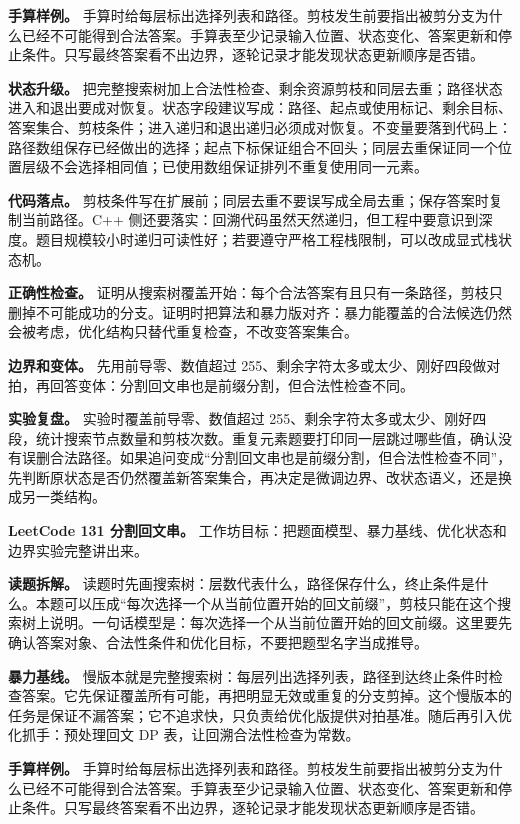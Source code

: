 \textbf{手算样例。} 手算时给每层标出选择列表和路径。剪枝发生前要指出被剪分支为什么已经不可能得到合法答案。手算表至少记录输入位置、状态变化、答案更新和停止条件。只写最终答案看不出边界，逐轮记录才能发现状态更新顺序是否错。

\textbf{状态升级。} 把完整搜索树加上合法性检查、剩余资源剪枝和同层去重；路径状态进入和退出要成对恢复。状态字段建议写成：路径、起点或使用标记、剩余目标、答案集合、剪枝条件；进入递归和退出递归必须成对恢复。不变量要落到代码上：路径数组保存已经做出的选择；起点下标保证组合不回头；同层去重保证同一个位置层级不会选择相同值；已使用数组保证排列不重复使用同一元素。

\textbf{代码落点。} 剪枝条件写在扩展前；同层去重不要误写成全局去重；保存答案时复制当前路径。C++ 侧还要落实：回溯代码虽然天然递归，但工程中要意识到深度。题目规模较小时递归可读性好；若要遵守严格工程栈限制，可以改成显式栈状态机。

\textbf{正确性检查。} 证明从搜索树覆盖开始：每个合法答案有且只有一条路径，剪枝只删掉不可能成功的分支。证明时把算法和暴力版对齐：暴力能覆盖的合法候选仍然会被考虑，优化结构只替代重复检查，不改变答案集合。

\textbf{边界和变体。} 先用前导零、数值超过 255、剩余字符太多或太少、刚好四段做对拍，再回答变体：分割回文串也是前缀分割，但合法性检查不同。

\textbf{实验复盘。} 实验时覆盖前导零、数值超过 255、剩余字符太多或太少、刚好四段，统计搜索节点数量和剪枝次数。重复元素题要打印同一层跳过哪些值，确认没有误删合法路径。如果追问变成“分割回文串也是前缀分割，但合法性检查不同”，先判断原状态是否仍然覆盖新答案集合，再决定是微调边界、改状态语义，还是换成另一类结构。

\noindent\textbf{LeetCode 131 分割回文串。} 工作坊目标：把题面模型、暴力基线、优化状态和边界实验完整讲出来。

\textbf{读题拆解。} 读题时先画搜索树：层数代表什么，路径保存什么，终止条件是什么。本题可以压成“每次选择一个从当前位置开始的回文前缀”，剪枝只能在这个搜索树上说明。一句话模型是：每次选择一个从当前位置开始的回文前缀。这里要先确认答案对象、合法性条件和优化目标，不要把题型名字当成推导。

\textbf{暴力基线。} 慢版本就是完整搜索树：每层列出选择列表，路径到达终止条件时检查答案。它先保证覆盖所有可能，再把明显无效或重复的分支剪掉。这个慢版本的任务是保证不漏答案；它不追求快，只负责给优化版提供对拍基准。随后再引入优化抓手：预处理回文 DP 表，让回溯合法性检查为常数。

\textbf{手算样例。} 手算时给每层标出选择列表和路径。剪枝发生前要指出被剪分支为什么已经不可能得到合法答案。手算表至少记录输入位置、状态变化、答案更新和停止条件。只写最终答案看不出边界，逐轮记录才能发现状态更新顺序是否错。

